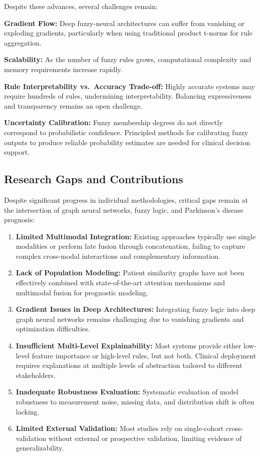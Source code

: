 \documentclass[conference]{IEEEtran}
\begin{document}
Despite these advances, several challenges remain:

\textbf{Gradient Flow:} Deep fuzzy-neural architectures can suffer from vanishing or exploding gradients, particularly when using traditional product t-norms for rule aggregation.

\textbf{Scalability:} As the number of fuzzy rules grows, computational complexity and memory requirements increase rapidly.

\textbf{Rule Interpretability vs.\ Accuracy Trade-off:} Highly accurate systems may require hundreds of rules, undermining interpretability. Balancing expressiveness and transparency remains an open challenge.

\textbf{Uncertainty Calibration:} Fuzzy membership degrees do not directly correspond to probabilistic confidence. Principled methods for calibrating fuzzy outputs to produce reliable probability estimates are needed for clinical decision support.

\subsection{Research Gaps and Contributions}

Despite significant progress in individual methodologies, critical gaps remain at the intersection of graph neural networks, fuzzy logic, and Parkinson's disease prognosis:

\begin{enumerate}
\item \textbf{Limited Multimodal Integration:} Existing approaches typically use single modalities or perform late fusion through concatenation, failing to capture complex cross-modal interactions and complementary information.

\item \textbf{Lack of Population Modeling:} Patient similarity graphs have not been effectively combined with state-of-the-art attention mechanisms and multimodal fusion for prognostic modeling.

\item \textbf{Gradient Issues in Deep Architectures:} Integrating fuzzy logic into deep graph neural networks remains challenging due to vanishing gradients and optimization difficulties.

\item \textbf{Insufficient Multi-Level Explainability:} Most systems provide either low-level feature importance or high-level rules, but not both. Clinical deployment requires explanations at multiple levels of abstraction tailored to different stakeholders.

\item \textbf{Inadequate Robustness Evaluation:} Systematic evaluation of model robustness to measurement noise, missing data, and distribution shift is often lacking.

\item \textbf{Limited External Validation:} Most studies rely on single-cohort cross-validation without external or prospective validation, limiting evidence of generalizability.
\end{enumerate}
\end{document}
